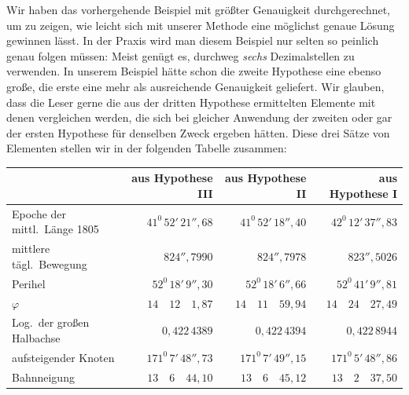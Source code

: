 Wir haben das vorhergehende Beispiel mit größter Genauigkeit durchgerechnet, um zu zeigen, wie leicht sich mit unserer Methode eine möglichst genaue Lösung gewinnen lässt. In der Praxis wird man diesem Beispiel nur selten so peinlich genau folgen müssen: Meist genügt es, durchweg \textit{sechs} Dezimalstellen zu verwenden. In unserem Beispiel hätte schon die zweite Hypothese eine ebenso große, die erste eine mehr als ausreichende Genauigkeit geliefert. Wir glauben, dass die Leser gerne die aus der dritten Hypothese ermittelten Elemente mit denen vergleichen werden, die sich bei gleicher Anwendung der zweiten oder gar der ersten Hypothese für denselben Zweck ergeben hätten. Diese drei Sätze von Elementen stellen wir in der folgenden Tabelle zusammen:
\begin{center}
\begingroup\footnotesize\setlength{\tabcolsep}{2pt}\renewcommand{\arraystretch}{1.2}
\begin{tabular}{|p{1.35in}|r|r|r|}\hline
& aus Hypothese III & aus Hypothese II & aus Hypothese I\\\hline
Epoche der mittl.\ Länge 1805 & $41^{0}\,52'\,21''{,}68$ & $41^{0}\,52'\,18''{,}40$ & $42^{0}\,12'\,37''{,}83$\\
mittlere tägl.\ Bewegung & $824''{,}7990$ & $824''{,}7978$ & $823''{,}5026$\\
Perihel & $52^{0}\,18'\,9''{,}30$ & $52^{0}\,18'\,6''{,}66$ & $52^{0}\,41'\,9''{,}81$\\
$\varphi$ & $14\quad12\quad1{,}87$ & $14\quad11\quad59{,}94$ & $14\quad24\quad27{,}49$\\
Log.\ der großen Halbachse & $0{,}422\,4389$ & $0{,}422\,4394$ & $0{,}422\,8944$\\
aufsteigender Knoten & $171^{0}\,7'\,48''{,}73$ & $171^{0}\,7'\,49''{,}15$ & $171^{0}\,5'\,48''{,}86$\\
Bahnneigung & $13\quad6\quad44{,}10$ & $13\quad6\quad45{,}12$ & $13\quad2\quad37{,}50$\\\hline
\end{tabular}\endgroup
\end{center}

